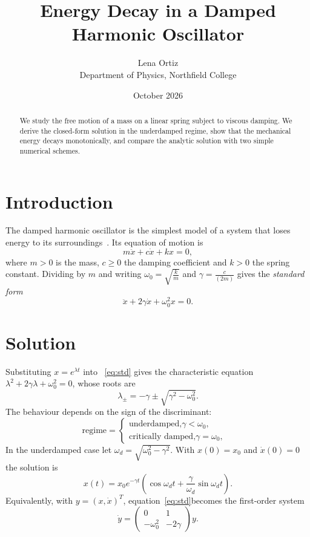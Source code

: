 \documentclass[11pt,a4paper]{article}
\title{Energy Decay in a Damped Harmonic Oscillator}
\author{Lena Ortiz\\ \small Department of Physics, Northfield College}
\date{October 2026}
\begin{document}
\maketitle

\begin{abstract}
We study the free motion of a mass on a linear spring subject to viscous damping. We derive the closed-form solution in the underdamped regime, show that the mechanical energy decays monotonically, and compare the analytic solution with two simple numerical schemes.
\end{abstract}

\section{Introduction}\label{sec:intro}

The damped harmonic oscillator is the simplest model of a system that loses energy to its surroundings~\cite{knuth1984}. Its equation of motion is
\begin{equation}
  m\ddot{x}+c\dot{x}+kx=0,
  \label{eq:motion}
\end{equation}
where $m>0$ is the mass, $c\geq0$ the damping coefficient and $k>0$ the spring constant. Dividing by $m$ and writing $\omega_{0}=\sqrt{\frac{k}{m}}$ and $\gamma=\frac{c}{(2m)}$ gives the \emph{standard form}
\begin{equation}
  \ddot{x}+2\gamma\dot{x}+\omega_{0}^{2}x=0.
  \label{eq:std}
\end{equation}

\section{Solution}\label{sec:method}

Substituting $x=e^{\lambda t}$ into ~\eqref{eq:std} gives the characteristic equation $\lambda^{2}+2\gamma\lambda+\omega_{0}^{2}=0$, whose roots are
\begin{equation}
  \lambda_{\pm}=-\gamma\pm\sqrt{\gamma^{2}-\omega_{0}^{2}}.
\end{equation}
The behaviour depends on the sign of the discriminant:
\begin{equation*}
  \text{regime}=\begin{cases}
\text{underdamped,}\gamma<\omega_{0}, &  \\
\text{critically damped,}\gamma=\omega_{0}, & 
\end{cases}
\end{equation*}
In the underdamped case let $\omega_{d}=\sqrt{\omega_{0}^{2}-\gamma^{2}}$. With $x(0)=x_{0}$ and $\dot{x}(0)=0$ the solution is
\begin{equation}
  x(t)=x_{0}e^{-\gamma t}\left( \cos\omega_{d}t+\frac{\gamma}{\omega_{d}}\sin\omega_{d}t \right).
\end{equation}
Equivalently, with $y=(x,\dot{x})^{T}$, equation~\eqref{eq:std}becomes the first-order system
\begin{equation}
  \dot{y}=\begin{pmatrix}
0 & 1 \\
-\omega_{0}^{2} & -2\gamma
\end{pmatrix}y.
\end{equation}
\end{document}
